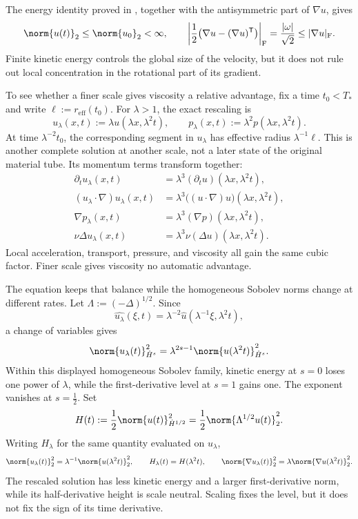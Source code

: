 The energy identity proved in , together with the antisymmetric part of \(\nabla u\), gives
\[
  \norm{u(t)}_2
  \leq
  \norm{u_0}_2
  <\infty,
  \qquad
  \left|\frac12\bigl(\nabla u-(\nabla u)^{\mathsf T}\bigr)\right|_{\mathrm F}
  =
  \frac{|\omega|}{\sqrt2}
  \leq
  |\nabla u|_{\mathrm F}.
\]
Finite kinetic energy controls the global size of the velocity, but it does not rule out local concentration in the rotational part of its gradient.


To see whether a finer scale gives viscosity a relative advantage, fix a time \(t_0<T_*\) and write \(\ell:=r_{\mathrm{eff}}(t_0)\). For \(\lambda>1\), the exact \NavierStokes{} rescaling is
\[
  u_\lambda(x,t)
  :=
  \lambda u(\lambda x,\lambda^2t),
  \qquad
  p_\lambda(x,t)
  :=
  \lambda^2p(\lambda x,\lambda^2t).
\]
At time \(\lambda^{-2}t_0\), the corresponding segment in \(u_\lambda\) has effective radius \(\lambda^{-1}\ell\). This is another complete solution at another scale, not a later state of the original material tube. Its momentum terms transform together:
\[
\begin{aligned}
  \partial_tu_\lambda(x,t)
  &=
  \lambda^3(\partial_tu)(\lambda x,\lambda^2t),
  \\
  (u_\lambda\cdot\nabla)u_\lambda(x,t)
  &=
  \lambda^3\bigl((u\cdot\nabla)u\bigr)(\lambda x,\lambda^2t),
  \\
  \nabla p_\lambda(x,t)
  &=
  \lambda^3(\nabla p)(\lambda x,\lambda^2t),
  \\
  \nu\Delta u_\lambda(x,t)
  &=
  \lambda^3\nu(\Delta u)(\lambda x,\lambda^2t).
\end{aligned}
\]
Local acceleration, transport, pressure, and viscosity all gain the same cubic factor. Finer scale gives viscosity no automatic advantage.


The equation keeps that balance while the homogeneous Sobolev norms change at different rates. Let \(\Lambda:=(-\Delta)^{1/2}\). Since
\[
  \widehat{u_\lambda}(\xi,t)
  =
  \lambda^{-2}\widehat u(\lambda^{-1}\xi,\lambda^2t),
\]
a change of variables gives
\[
  \norm{u_\lambda(t)}_{\dot H^s}^2
  =
  \lambda^{2s-1}
  \norm{u(\lambda^2t)}_{\dot H^s}^2.
\]
Within this displayed homogeneous Sobolev family, kinetic energy at \(s=0\) loses one power of \(\lambda\), while the first-derivative level at \(s=1\) gains one. The exponent vanishes at \(s=\tfrac12\). Set
\[
  H(t)
  :=
  \frac12\norm{u(t)}_{\dot H^{1/2}}^2
  =
  \frac12\norm{\Lambda^{1/2}u(t)}_2^2.
\]
Writing \(H_\lambda\) for the same quantity evaluated on \(u_\lambda\),
\[
  \norm{u_\lambda(t)}_2^2
  =
  \lambda^{-1}\norm{u(\lambda^2t)}_2^2,
  \qquad
  H_\lambda(t)=H(\lambda^2t),
  \qquad
  \norm{\nabla u_\lambda(t)}_2^2
  =
  \lambda\norm{\nabla u(\lambda^2t)}_2^2.
\]
The rescaled solution has less kinetic energy and a larger first-derivative norm, while its half-derivative height is scale neutral. Scaling fixes the level, but it does not fix the sign of its time derivative.

